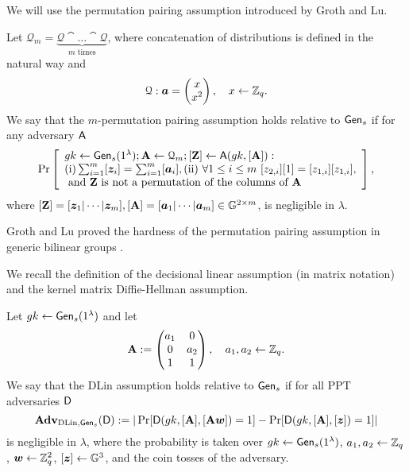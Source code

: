 We will use the permutation pairing assumption introduced by Groth and Lu.
\begin{definition}\label{def:ppa}
Let $\mathcal{Q}_{m}=\underbrace{\mathcal{Q}\cat\ldots\cat\mathcal{Q}}_{m\text{ times}}$, where concatenation of  distributions is defined in the natural way and 
$$\mathcal{Q}: {\boldsymbol{a}}=\left(\begin{matrix}x\\x^2\end{matrix}\right),\quad x\gets\mathbb{Z}_q.$$
We say that the $m$-permutation pairing assumption holds relative to $\mathsf{Gen}_s$ if for any adversary $\mathsf{A}$
$$
\Pr\left[
\begin{array}{l}
gk\gets\mathsf{Gen}_s(1^\lambda);\mathbf{{A}}\gets\mathcal{Q}_{m};[\mathbf{{Z}}]\gets\mathsf{A}(gk,[\mathbf{{A}}]):\\
\mathrm{(i)} \sum_{i=1}^{m}[{\boldsymbol{z}}_i]=\sum_{i=1}^{m}[{\boldsymbol{a}}_i], \mathrm{(ii)}\ \forall 1\leq i\leq m\ [z_{2,i}][1]=[z_{1,i}][z_{1,i}],\\
\text{ and }\mathbf{{Z}}\text{ is not a permutation of the columns of }\mathbf{{A}}
\end{array}
\right],
$$
where $[\mathbf{{Z}}]=[{\boldsymbol{z}}_1|\cdots|{\boldsymbol{z}}_m], [\mathbf{{A}}]=[{\boldsymbol{a}}_1|\cdots|{\boldsymbol{a}}_m]\in\mathbb{G}^{2\times m}$,
is negligible in $\lambda$.
\end{definition}
Groth and Lu proved the hardness of the permutation pairing assumption in generic bilinear groups \cite{AC:GroLu07}. 

We recall the definition of the decisional linear assumption (in matrix notation) and the kernel matrix Diffie-Hellman assumption.

\begin{definition}\label{def:dlin}
 Let  ${gk} 
\gets \mathsf{Gen}_s(1^\lambda)$ and let
$$
\mathbf{{A}} :=
\begin{pmatrix} 
a_1 & 0     \\
0     & a_2 \\
1     &  1
\end{pmatrix},
\quad
a_1,a_2\gets\mathbb{Z}_q.
$$
We say that the DLin assumption holds relative to $\mathsf{Gen}_s$ if for all PPT adversaries $\mathsf{D}$
$$
\mathbf{Adv}_{\mathrm{DLin},\mathsf{Gen}_s}(\mathsf{D}) := |
	\Pr[
		\mathsf{D}(
			gk,
			[\mathbf{{A}}],
			[\mathbf{{A}}{\boldsymbol{w}}])=1]
	-\Pr[
		\mathsf{D}(
		gk,
		[\mathbf{{A}}],
		[{\boldsymbol{z}}])=1]|
$$
is negligible in $\lambda$, where the probability is taken over $gk\gets\mathsf{Gen}_s(1^\lambda)$, $a_1,a_2\gets\mathbb{Z}_q$, ${\boldsymbol{w}}\gets\mathbb{Z}_q^2$, $[{\boldsymbol{z}}]\gets\mathbb{G}^3$, and the coin tosses of the adversary. 
\end{definition}

